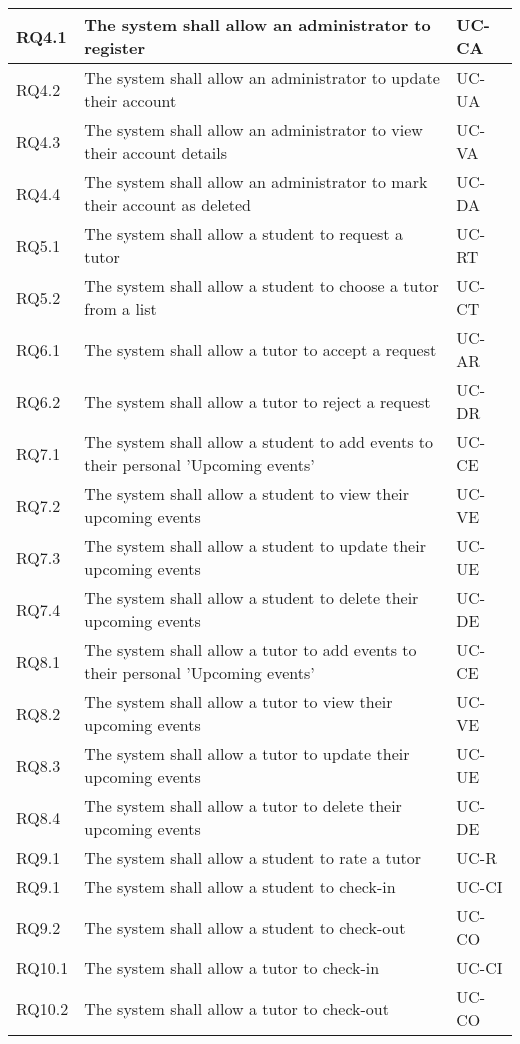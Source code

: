 \documentclass[12pt]{article}
\begin{document}
{\begin{longtable}{| l | p{10cm}| l |}
			RQ4.1 & The system shall allow an administrator to register  & UC-CA \\ \hline 
			RQ4.2 & The system shall allow an administrator to update their account & UC-UA \\ \hline  
			RQ4.3 & The system shall allow an administrator to view their account details  & UC-VA \\ \hline 
			RQ4.4 & The system shall allow an administrator to mark their account as deleted & UC-DA  \\ \hline 

				RQ5.1 & The system shall allow a student to request a tutor & UC-RT \\ \hline
				RQ5.2 & The system shall allow a student to choose a tutor from a list & UC-CT \\ \hline

				RQ6.1 & The system shall allow a tutor to accept a request & UC-AR \\ \hline
				RQ6.2 & The system shall allow a tutor to reject a request & UC-DR \\ \hline
		

				RQ7.1 & The system shall allow a student to add events to their personal 'Upcoming events'  & UC-CE \\ \hline	
				RQ7.2 & The system shall allow a student to view their upcoming events & UC-VE \\ \hline
				RQ7.3 & The system shall allow a student to update their upcoming events & UC-UE \\ \hline
				RQ7.4 & The system shall allow a student to delete their upcoming events & UC-DE\\ \hline
				
				RQ8.1 & The system shall allow a tutor to add events to their personal 'Upcoming events'  & UC-CE \\ \hline	
				RQ8.2 & The system shall allow a tutor to view their upcoming events & UC-VE \\ \hline
				RQ8.3 & The system shall allow a tutor to update their upcoming events & UC-UE \\ \hline
				RQ8.4 & The system shall allow a tutor to delete their upcoming events & UC-DE\\ \hline
								
				RQ9.1 & The system shall allow a student to rate a tutor & UC-R\\ \hline

				RQ9.1 & The system shall allow a student to check-in  & UC-CI \\ \hline	
				RQ9.2 & The system shall allow a student to check-out  & UC-CO \\ \hline
				RQ10.1 & The system shall allow a tutor to check-in  & UC-CI \\ 
\hline	
				RQ10.2 & The system shall allow a tutor to check-out  & UC-CO \\ \hline
				
			
\end{longtable}
}
\end{document}
